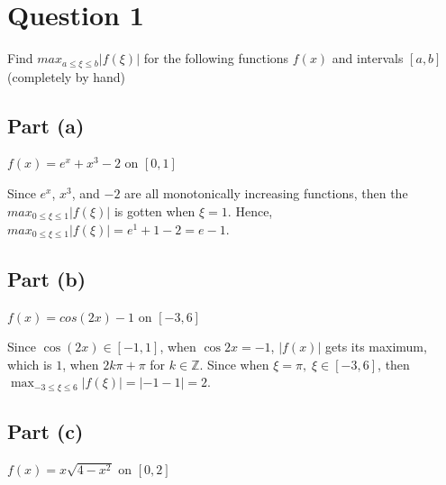 \section{Question 1}

\begin{question}
    Find $max_{a \leq \xi \leq b}\lvert f(\xi)\rvert$ for the following functions $f(x)$ and intervals $[a,b]$ (completely by hand)
\end{question}

\subsection{Part (a)}

\begin{question}
\begin{center}
    $f(x) = e^x + x^3 −2$ on $[0,1]$
\end{center}
\end{question}

\begin{answer}
    Since $e^x$, $x^3$, and $-2$ are all monotonically increasing functions, then the $max_{0 \leq \xi \leq 1}{\lvert f(\xi) \rvert}$ is gotten when $\xi = 1$. Hence, $max_{0 \leq \xi \leq 1}{\lvert f(\xi) \rvert} = e^1 + 1 - 2 = e - 1$.
\end{answer}

\subsection{Part (b)}

\begin{question}
\begin{center}
    $f(x) = cos(2x) − 1$ on $[−3,6]$
\end{center}
\end{question}

\begin{answer}
    Since $\cos{(2x) \in [-1,1]}$, when $\cos{2x} = -1$, $\lvert f(x) \rvert$ gets its maximum, which is $1$, when $2k\pi + \pi$ for $k \in \mathbb{Z}$. Since when $\xi = \pi, \; \xi \in [-3,6]$, then $\max_{-3 \leq \xi \leq 6}{\lvert f(\xi) \rvert} = \lvert -1 - 1 \rvert = 2$.
\end{answer}

\subsection{Part (c)}

\begin{question}
\begin{center}
    $f(x) = x\sqrt{4-x^2}$ on $[0,2]$
\end{center}
\end{question}
    
